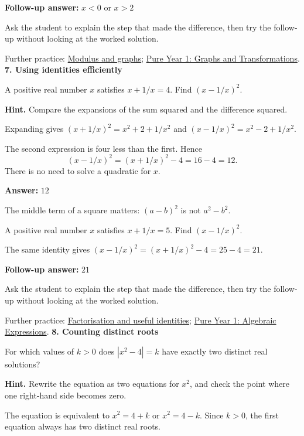 \documentclass[11pt,a4paper]{article}
\newcommand{\smallheading}[1]{\par\vspace{9pt}{\large\bfseries #1}\par\vspace{1pt}}
\begin{document}
\textbf{Follow-up answer:} \(x<0\) or \(x>2\)\par
\vfill\smallheading{Teaching note}
Ask the student to explain the step that made the difference, then try the follow-up without looking at the worked solution.\par
{\small Further practice: \href{https://maths.arijasad.com/modulus-and-graphs.html}{Modulus and graphs}; \href{https://maths.arijasad.com/edexcel-pure-year-1.html#chapter-4}{Pure Year 1: Graphs and Transformations}.}
\newpage
{\LARGE\bfseries 7. Using identities efficiently}\par
\smallheading{Diagnostic question}
A positive real number \(x\) satisfies \(x+1/x=4\). Find \((x-1/x)^2\).\par
\textbf{Hint.} Compare the expansions of the sum squared and the difference squared.\par
\smallheading{Worked solution}
Expanding gives \((x+1/x)^2=x^2+2+1/x^2\) and \((x-1/x)^2=x^2-2+1/x^2\).

The second expression is four less than the first. Hence \[(x-1/x)^2=(x+1/x)^2-4=16-4=12.\] There is no need to solve a quadratic for \(x\).

\textbf{Answer:} \(12\)\par
\smallheading{What to notice}
The middle term of a square matters: \((a-b)^2\) is not \(a^2-b^2\).\par
\smallheading{Matched follow-up}
A positive real number \(x\) satisfies \(x+1/x=5\). Find \((x-1/x)^2\).\par
The same identity gives \((x-1/x)^2=(x+1/x)^2-4=25-4=21\).

\textbf{Follow-up answer:} \(21\)\par
\vfill\smallheading{Teaching note}
Ask the student to explain the step that made the difference, then try the follow-up without looking at the worked solution.\par
{\small Further practice: \href{https://maths.arijasad.com/algebra-and-factorisation.html}{Factorisation and useful identities}; \href{https://maths.arijasad.com/edexcel-pure-year-1.html#chapter-1}{Pure Year 1: Algebraic Expressions}.}
\newpage
{\LARGE\bfseries 8. Counting distinct roots}\par
\smallheading{Diagnostic question}
For which values of \(k>0\) does \(|x^2-4|=k\) have exactly two distinct real solutions?\par
\textbf{Hint.} Rewrite the equation as two equations for \(x^2\), and check the point where one right-hand side becomes zero.\par
\smallheading{Worked solution}
The equation is equivalent to \(x^2=4+k\) or \(x^2=4-k\). Since \(k>0\), the first equation always has two distinct real roots.
\end{document}
